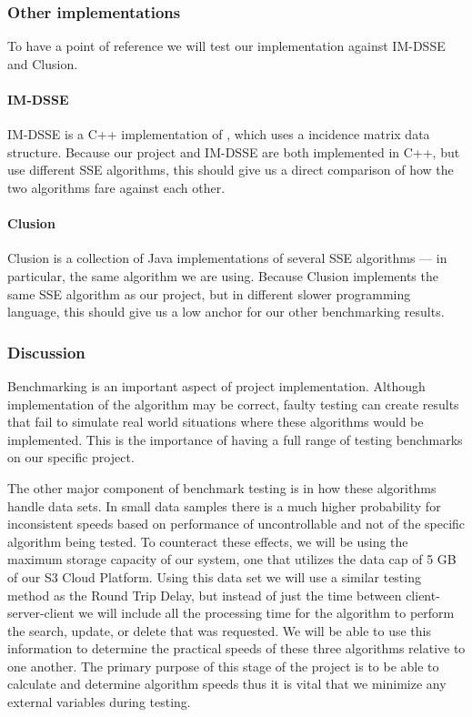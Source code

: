 \documentclass[onecolumn, draftclsnofoot,10pt, compsoc]{IEEEtran}
\begin{document}
\subsubsection {Other implementations}

To have a point of reference we will test our implementation against IM-DSSE and Clusion.

\paragraph{IM-DSSE}
IM-DSSE \cite{im-dsse} is a C++ implementation of \cite{yavuz15}, which uses a incidence matrix data structure. Because our project and IM-DSSE are both implemented in C++, but use different SSE algorithms, this should give us a direct comparison of how the two algorithms fare against each other.

\paragraph{Clusion}
Clusion \cite{clusion} is a collection of Java implementations of several SSE algorithms --- in particular, the same algorithm we are using. Because Clusion implements the same SSE algorithm as our project, but in different slower programming language, this should give us a low anchor for our other benchmarking results.

\subsubsection {Discussion}

Benchmarking is an important aspect of project implementation.
Although implementation of the algorithm may be correct, faulty testing can create results that fail to simulate real world situations where these algorithms would be implemented.
This is the importance of having a full range of testing benchmarks on our specific project.

The other major component of benchmark testing is in how these algorithms handle data sets.
In small data samples there is a much higher probability for inconsistent speeds based on performance of uncontrollable and not of the specific algorithm being tested.
To counteract these effects, we will be using the maximum storage capacity of our system, one that utilizes the data cap of 5 GB of our S3 Cloud Platform. Using this data set we will use a similar testing method as the Round Trip Delay, but instead of just the time between client-server-client we will include all the processing time for the algorithm to perform the search, update, or delete that was requested.
We will be able to use this information to determine the practical speeds of these three algorithms relative to one another.
The primary purpose of this stage of the project is to be able to calculate and determine algorithm speeds thus it is vital that we minimize any external variables during testing. 
\end{document}
